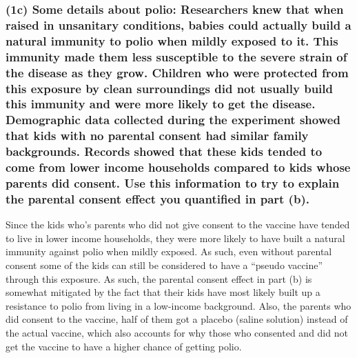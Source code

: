 \documentclass[
]{article}
\begin{document}
\hypertarget{c-some-details-about-polio-researchers-knew-that-when-raised-in-unsanitary-conditions-babies-could-actually-build-a-natural-immunity-to-polio-when-mildly-exposed-to-it.-this-immunity-made-them-less-susceptible-to-the-severe-strain-of-the-disease-as-they-grow.-children-who-were-protected-from-this-exposure-by-clean-surroundings-did-not-usually-build-this-immunity-and-were-more-likely-to-get-the-disease.-demographic-data-collected-during-the-experiment-showed-that-kids-with-no-parental-consent-had-similar-family-backgrounds.-records-showed-that-these-kids-tended-to-come-from-lower-income-households-compared-to-kids-whose-parents-did-consent.-use-this-information-to-try-to-explain-the-parental-consent-effect-you-quantified-in-part-b.}{%
\subsubsection{(1c) Some details about polio: Researchers knew that when
raised in unsanitary conditions, babies could actually build a natural
immunity to polio when mildly exposed to it. This immunity made them
less susceptible to the severe strain of the disease as they grow.
Children who were protected from this exposure by clean surroundings did
not usually build this immunity and were more likely to get the disease.
Demographic data collected during the experiment showed that kids with
no parental consent had similar family backgrounds. Records showed that
these kids tended to come from lower income households compared to kids
whose parents did consent. Use this information to try to explain the
parental consent effect you quantified in part
(b).}\label{c-some-details-about-polio-researchers-knew-that-when-raised-in-unsanitary-conditions-babies-could-actually-build-a-natural-immunity-to-polio-when-mildly-exposed-to-it.-this-immunity-made-them-less-susceptible-to-the-severe-strain-of-the-disease-as-they-grow.-children-who-were-protected-from-this-exposure-by-clean-surroundings-did-not-usually-build-this-immunity-and-were-more-likely-to-get-the-disease.-demographic-data-collected-during-the-experiment-showed-that-kids-with-no-parental-consent-had-similar-family-backgrounds.-records-showed-that-these-kids-tended-to-come-from-lower-income-households-compared-to-kids-whose-parents-did-consent.-use-this-information-to-try-to-explain-the-parental-consent-effect-you-quantified-in-part-b.}}

Since the kids who's parents who did not give consent to the vaccine
have tended to live in lower income households, they were more likely to
have built a natural immunity against polio when mildly exposed. As
such, even without parental consent some of the kids can still be
considered to have a ``pseudo vaccine'' through this exposure. As such,
the parental consent effect in part (b) is somewhat mitigated by the
fact that their kids have most likely built up a resistance to polio
from living in a low-income background. Also, the parents who did
consent to the vaccine, half of them got a placebo (saline solution)
instead of the actual vaccine, which also accounts for why those who
consented and did not get the vaccine to have a higher chance of getting
polio.
\end{document}
